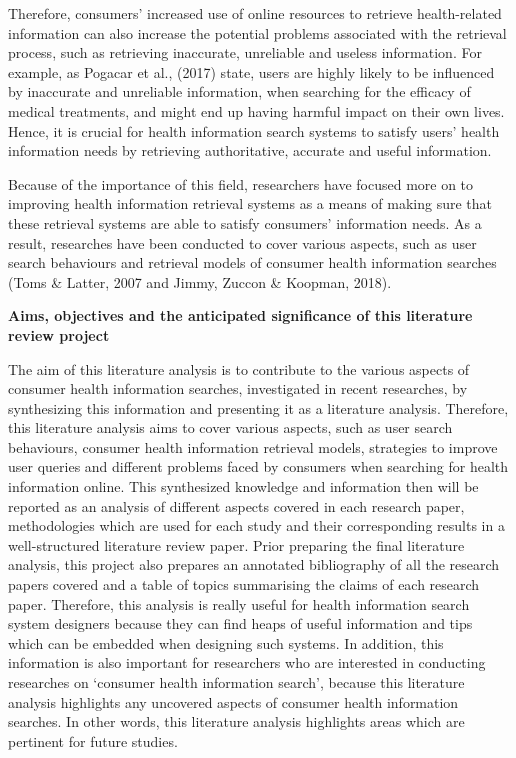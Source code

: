 \documentclass[]{article}
\begin{document}
Therefore, consumers’ increased use of online resources to retrieve health-related information can also increase the potential problems associated with the retrieval process, such as retrieving inaccurate, unreliable and useless information. For example, as Pogacar et al., (2017) state, users are highly likely to be influenced by inaccurate and unreliable information, when searching for the efficacy of medical treatments, and might end up having harmful impact on their own lives. Hence, it is crucial for health information search systems to satisfy users’ health information needs by retrieving authoritative, accurate and useful information.  
	
Because of the importance of this field, researchers have focused more on to improving health information retrieval systems as a means of making sure that these retrieval systems are able to satisfy consumers’ information needs. As a result, researches have been conducted to cover various aspects, such as user search behaviours and retrieval models of consumer health information searches (Toms \& Latter, 2007 and Jimmy, Zuccon \& Koopman, 2018).    
	
\textbf{Aims, objectives and the anticipated significance of this literature review project}
	
The aim of this literature analysis is to contribute to the various aspects of consumer health information searches, investigated in recent researches, by synthesizing this information and presenting it as a literature analysis. Therefore, this literature analysis aims to cover various aspects, such as user search behaviours, consumer health information retrieval models, strategies to improve user queries and different problems faced by consumers when searching for health information online. This synthesized knowledge and information then will be reported as an analysis of different aspects covered in each research paper, methodologies which are used for each study and their corresponding results in a well-structured literature review paper. Prior preparing the final literature analysis, this project also prepares an annotated bibliography of all the research papers covered and a table of topics summarising the claims of each research paper. Therefore, this analysis is really useful for health information search system designers because they can find heaps of useful information and tips which can be embedded when designing such systems. In addition, this information is also important for researchers who are interested in conducting researches on ‘consumer health information search’, because this literature analysis highlights any uncovered aspects of consumer health information searches. In other words, this literature analysis highlights areas which are pertinent for future studies.   
	
\end{document}
